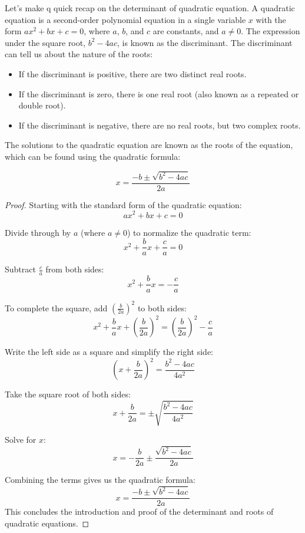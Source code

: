 \documentclass[
	12pt, %
	fleqn, %
	a4paper, %
]{LegrandOrangeBook}
\begin{document}
Let's make q quick recap on the determinant of quadratic equation.
A quadratic equation is a second-order polynomial equation in a single variable \(x\) with the form \(ax^2 + bx + c = 0\), where \(a\), \(b\), and \(c\) are constants, and \(a \neq 0\). 
The expression under the square root, \(b^2 - 4ac\), is known as the discriminant. The discriminant can tell us about the nature of the roots:
\begin{itemize}
\item If the discriminant is positive, there are two distinct real roots.
\item If the discriminant is zero, there is one real root (also known as a repeated or double root).
\item If the discriminant is negative, there are no real roots, but two complex roots.
\end{itemize}
The solutions to the quadratic equation are known as the roots of the equation, which can be found using the quadratic formula:
\begin{theorem}
    \[ x = \frac{{-b \pm \sqrt{{b^2 - 4ac}}}}{2a} \]
\end{theorem}
\begin{proof}
    Starting with the standard form of the quadratic equation:
\[ ax^2 + bx + c = 0 \]

Divide through by \(a\) (where \(a \neq 0\)) to normalize the quadratic term:
\[ x^2 + \frac{b}{a}x + \frac{c}{a} = 0 \]

Subtract \(\frac{c}{a}\) from both sides:
\[ x^2 + \frac{b}{a}x = -\frac{c}{a} \]

To complete the square, add \(\left(\frac{b}{2a}\right)^2\) to both sides:
\[ x^2 + \frac{b}{a}x + \left(\frac{b}{2a}\right)^2 = \left(\frac{b}{2a}\right)^2 - \frac{c}{a} \]

Write the left side as a square and simplify the right side:
\[ \left(x + \frac{b}{2a}\right)^2 = \frac{b^2 - 4ac}{4a^2} \]

Take the square root of both sides:
\[ x + \frac{b}{2a} = \pm \sqrt{\frac{b^2 - 4ac}{4a^2}} \]

Solve for \(x\):
\[ x = -\frac{b}{2a} \pm \frac{\sqrt{b^2 - 4ac}}{2a} \]

Combining the terms gives us the quadratic formula:
\[ x = \frac{-b \pm \sqrt{b^2 - 4ac}}{2a} \]
This concludes the introduction and proof of the determinant and roots of quadratic equations.
\end{proof}
\end{document}
